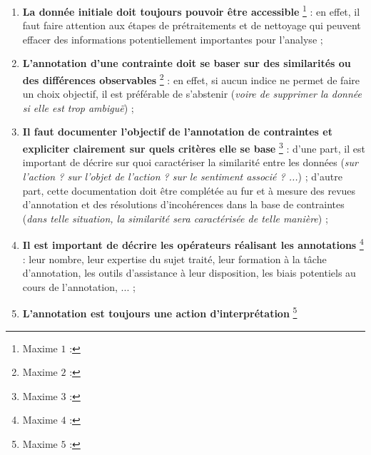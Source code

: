 		\begin{enumerate}
			\item \textbf{La donnée initiale doit toujours pouvoir être accessible} \footnote{
				Maxime $1$ : 
			} :
			en effet, il faut faire attention aux étapes de prétraitements et de nettoyage qui peuvent effacer des informations potentiellement importantes pour l'analyse ;
			\item \textbf{L'annotation d'une contrainte doit se baser sur des similarités ou des différences observables} \footnote{
				Maxime $2$ : 
			} :
			en effet, si aucun indice ne permet de faire un choix objectif, il est préférable de s'abstenir (\textit{voire de supprimer la donnée si elle est trop ambiguë}) ;
			\item \textbf{Il faut documenter l'objectif de l'annotation de contraintes et expliciter clairement sur quels critères elle se base} \footnote{
				Maxime $3$ : 
			} :
			d'une part, il est important de décrire sur quoi caractériser la similarité entre les données (\textit{sur l'action ? sur l'objet de l'action ? sur le sentiment associé ? ...}) ;
			d'autre part, cette documentation doit être complétée au fur et à mesure des revues d'annotation et des résolutions d'incohérences dans la base de contraintes (\textit{dans telle situation, la similarité sera caractérisée de telle manière}) ;
			\item \textbf{Il est important de  décrire les opérateurs réalisant les annotations} \footnote{
				Maxime $4$ : 
			} :
			leur nombre, leur expertise du sujet traité, leur formation à la tâche d'annotation, les outils d'assistance à leur disposition, les biais potentiels au cours de l'annotation, ... ;
			\item \textbf{L'annotation est toujours une action d'interprétation} \footnote{
				Maxime $5$ : 
}
\end{enumerate}
